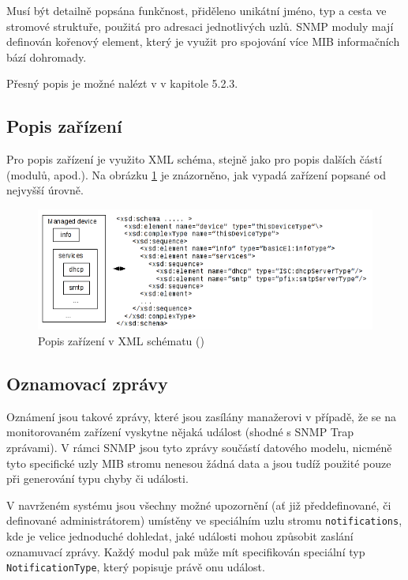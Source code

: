 Musí být detailně popsána funkčnost, přiděleno unikátní jméno, typ a cesta ve stromové struktuře, použitá pro adresaci jednotlivých uzlů. 
SNMP moduly mají definován kořenový element, který je využit pro spojování více MIB informačních bází dohromady.

Přesný popis je možné nalézt v \cite{macejko_dipl} v kapitole 5.2.3.

\subsection{Popis zařízení}
Pro popis zařízení je využito XML schéma, stejně jako pro popis dalších částí (modulů, apod.). Na obrázku \ref{obr_xml_popis_zarizeni} je znázorněno,
jak vypadá zařízení popsané od nejvyšší úrovně. 

\begin{figure}[htp]
	\begin{center}
		\includegraphics[width=15cm]{obrazky/03_popis_zarizeni.png}
		\caption{Popis zařízení v XML schématu (\cite{macejko_dipl})}
		\label{obr_xml_popis_zarizeni}
	\end{center}
\end{figure}

\subsection{Oznamovací zprávy}
Oznámení jsou takové zprávy, které jsou zasílány manažerovi v případě, že se na monitorovaném zařízení vyskytne nějaká událost (shodné s SNMP Trap zprávami).
V rámci SNMP jsou tyto zprávy součástí datového modelu, nicméně tyto specifické uzly MIB stromu nenesou žádná data a jsou tudíž použité pouze při generování typu
chyby či události. 

V navrženém systému jsou všechny možné upozornění (ať již předdefinované, či definované administrátorem) umístěny ve speciálním uzlu stromu \verb|notifications|, 
kde je velice jednoduché dohledat, jaké události mohou způsobit zaslání oznamuvací zprávy. Každý modul pak může mít specifikován speciální typ \verb|NotificationType|,
který popisuje právě onu událost.

